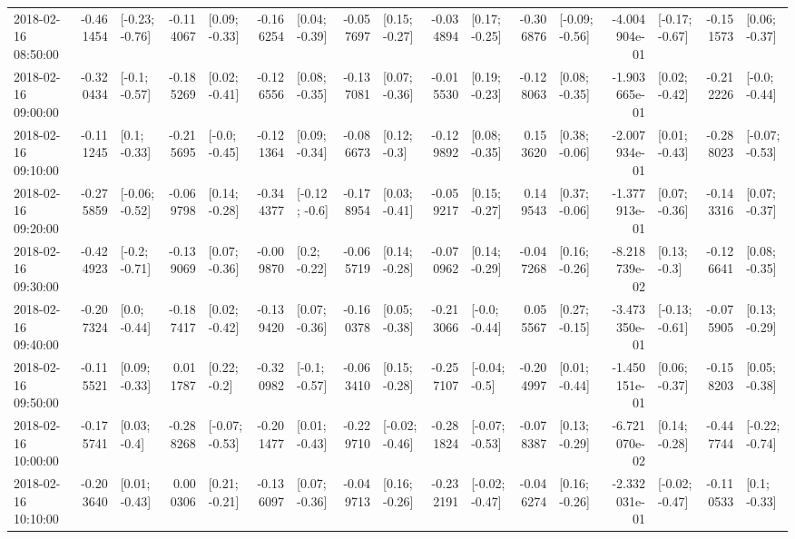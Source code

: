 \begin{tabular}{lrlrlrlrlrlrlrlrl}
2018-02-16 08:50:00 & -0.461454 &  [-0.23; -0.76] & -0.114067 &   [0.09; -0.33] & -0.166254 &   [0.04; -0.39] & -0.057697 &   [0.15; -0.27] & -0.034894 &   [0.17; -0.25] & -0.306876 &  [-0.09; -0.56] & -4.004904e-01 &  [-0.17; -0.67] & -0.151573 &   [0.06; -0.37] \\
2018-02-16 09:00:00 & -0.320434 &   [-0.1; -0.57] & -0.185269 &   [0.02; -0.41] & -0.126556 &   [0.08; -0.35] & -0.137081 &   [0.07; -0.36] & -0.015530 &   [0.19; -0.23] & -0.128063 &   [0.08; -0.35] & -1.903665e-01 &   [0.02; -0.42] & -0.212226 &   [-0.0; -0.44] \\
2018-02-16 09:10:00 & -0.111245 &    [0.1; -0.33] & -0.215695 &   [-0.0; -0.45] & -0.121364 &   [0.09; -0.34] & -0.086673 &    [0.12; -0.3] & -0.129892 &   [0.08; -0.35] &  0.153620 &   [0.38; -0.06] & -2.007934e-01 &   [0.01; -0.43] & -0.288023 &  [-0.07; -0.53] \\
2018-02-16 09:20:00 & -0.275859 &  [-0.06; -0.52] & -0.069798 &   [0.14; -0.28] & -0.344377 &   [-0.12; -0.6] & -0.178954 &   [0.03; -0.41] & -0.059217 &   [0.15; -0.27] &  0.149543 &   [0.37; -0.06] & -1.377913e-01 &   [0.07; -0.36] & -0.143316 &   [0.07; -0.37] \\
2018-02-16 09:30:00 & -0.424923 &   [-0.2; -0.71] & -0.139069 &   [0.07; -0.36] & -0.009870 &    [0.2; -0.22] & -0.065719 &   [0.14; -0.28] & -0.070962 &   [0.14; -0.29] & -0.047268 &   [0.16; -0.26] & -8.218739e-02 &    [0.13; -0.3] & -0.126641 &   [0.08; -0.35] \\
2018-02-16 09:40:00 & -0.207324 &    [0.0; -0.44] & -0.187417 &   [0.02; -0.42] & -0.139420 &   [0.07; -0.36] & -0.160378 &   [0.05; -0.38] & -0.213066 &   [-0.0; -0.44] &  0.055567 &   [0.27; -0.15] & -3.473350e-01 &  [-0.13; -0.61] & -0.075905 &   [0.13; -0.29] \\
2018-02-16 09:50:00 & -0.115521 &   [0.09; -0.33] &  0.011787 &    [0.22; -0.2] & -0.320982 &   [-0.1; -0.57] & -0.063410 &   [0.15; -0.28] & -0.257107 &   [-0.04; -0.5] & -0.204997 &   [0.01; -0.44] & -1.450151e-01 &   [0.06; -0.37] & -0.158203 &   [0.05; -0.38] \\
2018-02-16 10:00:00 & -0.175741 &    [0.03; -0.4] & -0.288268 &  [-0.07; -0.53] & -0.201477 &   [0.01; -0.43] & -0.229710 &  [-0.02; -0.46] & -0.281824 &  [-0.07; -0.53] & -0.078387 &   [0.13; -0.29] & -6.721070e-02 &   [0.14; -0.28] & -0.447744 &  [-0.22; -0.74] \\
2018-02-16 10:10:00 & -0.203640 &   [0.01; -0.43] &  0.000306 &   [0.21; -0.21] & -0.136097 &   [0.07; -0.36] & -0.049713 &   [0.16; -0.26] & -0.232191 &  [-0.02; -0.47] & -0.046274 &   [0.16; -0.26] & -2.332031e-01 &  [-0.02; -0.47] & -0.110533 &    [0.1; -0.33] \\

\end{tabular}
